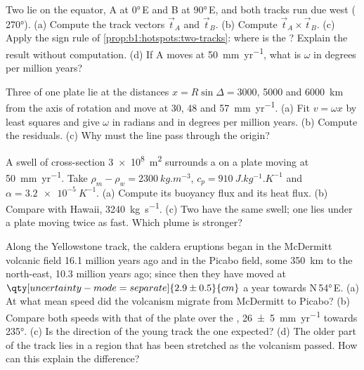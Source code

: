 \begin{exercise}[$\star\star$]\label{exo:b1:hotspots:5}
Two  lie on the equator, A at \ang{0}\,E and B at \ang{90}\,E, and
both tracks run due west ( \ang{270}). (a) Compute the track vectors
$\vec t_A$ and $\vec t_B$. (b) Compute $\vec t_A\times\vec t_B$. (c) Apply the
sign rule of \cref{prop:b1:hotspots:two-tracks}: where is the ?
Explain the result without computation. (d) If A moves at \qty{50}{mm.yr^{-1}},
what is $\omega$ in degrees per million years?
\end{exercise}

\begin{exercise}[$\star\star$]\label{exo:b1:hotspots:6}
Three  of one plate lie at the distances $x = R\sin\Delta = 3000$, 5000
and \qty{6000}{km} from the axis of rotation and move at 30, 48 and
\qty{57}{mm.yr^{-1}}. (a) Fit $v = \omega x$ by least squares and give
$\omega$ in radians and in degrees per million years. (b) Compute the
residuals. (c) Why must the line pass through the origin?
\end{exercise}

\begin{exercise}[$\star\star$]\label{exo:b1:hotspots:7}
A swell of cross-section \qty{3e8}{m^2} surrounds a  on a plate
moving at \qty{50}{mm.yr^{-1}}. Take $\rho_m - \rho_w = \qty{2300}{kg.m^{-3}}$,
$c_p = \qty{910}{J.kg^{-1}.K^{-1}}$ and $\alpha = \qty{3.2e-5}{K^{-1}}$. (a)
Compute its buoyancy flux and its heat flux. (b) Compare with Hawaii,
\qty{3240}{kg.s^{-1}}. (c) Two  have the same swell; one lies under a
plate moving twice as fast. Which plume is stronger?
\end{exercise}

\begin{exercise}[$\star\star$]\label{exo:b1:hotspots:8}
Along the Yellowstone track, the caldera eruptions began in the McDermitt
volcanic field 16.1 million years ago and in the Picabo field, some
\qty{350}{km} to the north-east, 10.3 million years ago; since then they have
moved at $\qty[uncertainty-mode=separate]{2.9 \pm 0.5}{cm}$ a year towards
N\,\ang{54}\,E. (a) At what mean speed did the volcanism migrate from McDermitt
to Picabo? (b) Compare both speeds with that of the plate over the ,
\qty[uncertainty-mode=separate]{26 \pm 5}{mm.yr^{-1}} towards \ang{235}. (c) Is
the direction of the young track the one expected? (d) The older part of the
track lies in a region that has been stretched as the volcanism passed. How
can this explain the difference?
\end{exercise}

